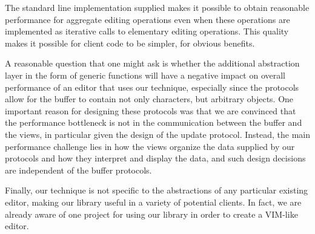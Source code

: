 The standard line implementation supplied makes it possible to obtain
reasonable performance for aggregate editing operations even when
these operations are implemented as iterative calls to elementary
editing operations.  This quality makes it possible for client code to
be simpler, for obvious benefits.

A reasonable question that one might ask is whether the additional
abstraction layer in the form of generic functions will have a
negative impact on overall performance of an editor that uses our
technique, especially since the protocols allow for the buffer to
contain not only characters, but arbitrary objects.  One important
reason for designing these protocols was that we are convinced that
the performance bottleneck is not in the communication between the
buffer and the views, in particular given the design of the update
protocol.  Instead, the main performance challenge lies in how the
views organize the data supplied by our protocols and how they
interpret and display the data, and such design decisions are
independent of the buffer protocols.

Finally, our technique is not specific to the abstractions of any
particular existing editor, making our library useful in a variety of
potential clients.  In fact, we are already aware of one project for
using our library in order to create a VIM-like editor.
